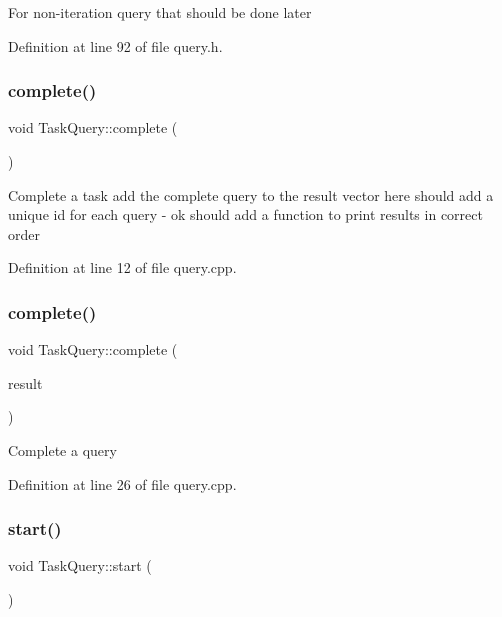 For non-\/iteration query that should be done later 

Definition at line 92 of file query.\+h.

\mbox{\label{class_task_query_ab77bfd5f991d0cc596592966d3ed6193}} 
\subsubsection{\texorpdfstring{complete()}{complete()}\hspace{0.1cm}{\footnotesize\ttfamily [1/2]}}
{\footnotesize\ttfamily void Task\+Query\+::complete (\begin{DoxyParamCaption}{ }\end{DoxyParamCaption})}

Complete a task add the complete query to the result vector here should add a unique id for each query -\/ ok should add a function to print results in correct order

Definition at line 12 of file query.\+cpp.

\mbox{\label{class_task_query_a91f0bc0a82e23db824e3ae6052026def}} 
\subsubsection{\texorpdfstring{complete()}{complete()}\hspace{0.1cm}{\footnotesize\ttfamily [2/2]}}
{\footnotesize\ttfamily void Task\+Query\+::complete (\begin{DoxyParamCaption}\item[{Query\+Result\+::\+Ptr \&\&}]{result }\end{DoxyParamCaption})}

Complete a query 

Definition at line 26 of file query.\+cpp.

\mbox{\label{class_task_query_ad34220bba4a3fab50e5f59f63d7cf5e2}} 
\subsubsection{\texorpdfstring{start()}{start()}}
{\footnotesize\ttfamily void Task\+Query\+::start (\begin{DoxyParamCaption}{ }\end{DoxyParamCaption})}

